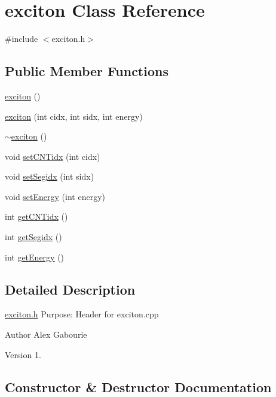 \hypertarget{classexciton}{}\section{exciton Class Reference}
\label{classexciton}


{\ttfamily \#include $<$exciton.\+h$>$}

\subsection*{Public Member Functions}
\begin{DoxyCompactItemize}
\item 
\hyperlink{classexciton_a54f50a6cdbe3fd159deb69db9499fbd2}{exciton} ()
\item 
\hyperlink{classexciton_add5526cbad14a07c6bfe908f51da4063}{exciton} (int cidx, int sidx, int energy)
\item 
\hyperlink{classexciton_a13cdf32065e97a18b85278070ac9d2a2}{$\sim$exciton} ()
\item 
void \hyperlink{classexciton_ae6db285bf5ece83d6e43d0739af762e2}{set\+C\+N\+Tidx} (int cidx)
\item 
void \hyperlink{classexciton_a4bf3789a1a6c12573bbf4665162a7c8f}{set\+Segidx} (int sidx)
\item 
void \hyperlink{classexciton_a255a2c84fcca9658587357150b1a8a72}{set\+Energy} (int energy)
\item 
int \hyperlink{classexciton_a4434250c3417712e4fe5951eaf704ebd}{get\+C\+N\+Tidx} ()
\item 
int \hyperlink{classexciton_abe3d5c7238a60e5a862f1ad33958348d}{get\+Segidx} ()
\item 
int \hyperlink{classexciton_acd8df9fa95ded566b099d3a700c84a94}{get\+Energy} ()
\end{DoxyCompactItemize}


\subsection{Detailed Description}
\hyperlink{exciton_8h_source}{exciton.\+h} Purpose\+: Header for exciton.\+cpp

\begin{DoxyAuthor}{Author}
Alex Gabourie 
\end{DoxyAuthor}
\begin{DoxyVersion}{Version}
1. 
\end{DoxyVersion}


\subsection{Constructor \& Destructor Documentation}
\hypertarget{classexciton_a54f50a6cdbe3fd159deb69db9499fbd2}{}
